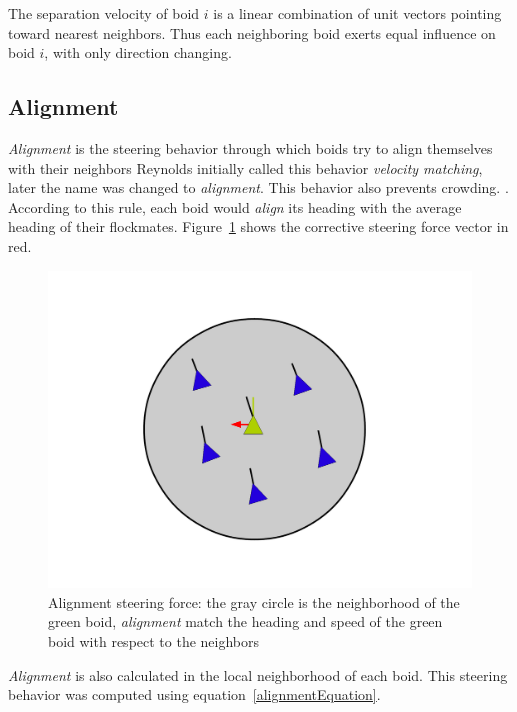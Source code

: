 The separation velocity of boid $i$ is a linear combination of 
unit vectors pointing toward nearest neighbors. Thus each neighboring boid exerts 
equal influence on boid $i$, with only direction changing. 

\subsection{Alignment}
\textit{Alignment} is the steering behavior through which boids try to align themselves with their neighbors  Reynolds initially called this behavior \textit{velocity matching}, later the name was changed to \textit{alignment}. This behavior also prevents crowding. . According to this rule, each boid would \textit{align} its heading with the average heading of their flockmates.  Figure~\ref{alignmentPDF} shows the corrective steering force vector in red.

\begin{figure}[htbp]
\begin{center}
\includegraphics[scale=0.3]{figures/alignment.pdf}
\caption{Alignment steering force: the gray circle is the neighborhood of the green boid, \textit{alignment} match the heading and speed of the green boid with respect to the neighbors}
\label{alignmentPDF}
\end{center}
\end{figure}

\textit{Alignment} is also calculated in the local neighborhood of each boid. This steering behavior was computed using equation~\ref{alignmentEquation}.


